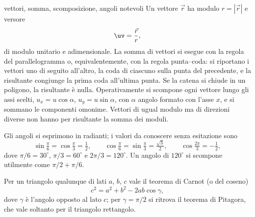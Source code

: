 \documentclass[main.tex]{subfiles}
\begin{document}
\begin{richiamo}{vettori, somma, scomposizione, angoli notevoli}
Un vettore $\vec r$ ha modulo $r=|\vec r|$ e versore
\[
\uv=\frac{\vec r}{r},
\]
di modulo unitario e adimensionale. La somma di vettori si esegue con la regola del parallelogramma o, equivalentemente, con la regola punta--coda: si riportano i vettori uno di seguito all'altro, la coda di ciascuno sulla punta del precedente, e la risultante congiunge la prima coda all'ultima punta. Se la catena si chiude in un poligono, la risultante è nulla. Operativamente si scompone ogni vettore lungo gli assi scelti, $u_x=u\cos\alpha$, $u_y=u\sin\alpha$, con $\alpha$ angolo formato con l'asse $x$, e si sommano le componenti omonime. Vettori di ugual modulo ma di direzioni diverse non hanno per risultante la somma dei moduli.

Gli angoli si esprimono in radianti; i valori da conoscere senza esitazione sono
\[
\sin\tfrac{\pi}{6}=\cos\tfrac{\pi}{3}=\tfrac12,\qquad
\cos\tfrac{\pi}{6}=\sin\tfrac{\pi}{3}=\tfrac{\sqrt3}{2},\qquad
\cos\tfrac{2\pi}{3}=-\tfrac12,
\]
dove $\pi/6=30^\circ$, $\pi/3=60^\circ$ e $2\pi/3=120^\circ$. Un angolo di $120^\circ$ si scompone utilmente come $\pi/2+\pi/6$.

Per un triangolo qualunque di lati $a$, $b$, $c$ vale il teorema di Carnot (o del coseno)
\[
c^2=a^2+b^2-2ab\cos\gamma ,
\]
dove $\gamma$ è l'angolo opposto al lato $c$; per $\gamma=\pi/2$ si ritrova il teorema di Pitagora, che vale soltanto per il triangolo rettangolo.
\end{richiamo}
\end{document}
